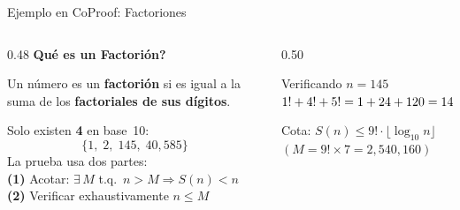 \documentclass[aspectratio=169, 10pt]{beamer}
\newcommand{\yes}{\textcolor{cpTeal}{\checkmark}}
\begin{document}
\begin{frame}{Ejemplo en CoProof: Factoriones}
  \begin{columns}[T]
    \begin{column}{0.48\textwidth}
      \textbf{\textquestiondown Qu\'{e} es un Factori\'{o}n?}
      \vspace{0.25cm}

      Un n\'{u}mero es un \textbf{factori\'{o}n} si es igual a la suma de los
      \textbf{factoriales de sus d\'{i}gitos}.

      \vspace{0.25cm}
      {\small Solo existen \textbf{4} en base~10:}
      \[\{1,\;2,\;145,\;40{,}585\}\]
      {\scriptsize\color{cpGray}
        La prueba usa dos partes:\\[3pt]
        \textbf{(1)} Acotar: $\exists\,M$ t.q.\ $n>M \Rightarrow S(n)<n$\\[2pt]
        \textbf{(2)} Verificar exhaustivamente $n\leq M$
      }
    \end{column}
    \begin{column}{0.50\textwidth}
      \begin{block}{Verificando $n = 145$}
        \centering\vspace{0.06cm}
        {\small $1! + 4! + 5! = 1 + 24 + 120 = 145\;\yes$}
        \vspace{0.06cm}
      \end{block}
      \vspace{0.12cm}
      {\scriptsize\color{cpGray}Cota: $S(n)\leq 9!\cdot\lfloor\log_{10}n\rfloor$\quad
      $(M = 9!\times 7 = 2{,}540{,}160)$}
      \vspace{0.18cm}


\end{column}
\end{columns}
\end{frame}
\end{document}
